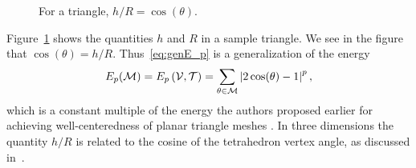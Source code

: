 \documentclass[final]{siamltex}
\begin{document}
\begin{figure}
  \centering
  \caption{For a triangle, $h/R = \cos(\theta).$}
  \label{fig:genE_p}
\end{figure}
 
Figure~\ref{fig:genE_p} shows the quantities $h$ and $R$ in a sample
triangle.
We see in the figure that $\cos(\theta) = h/R$.
Thus~\eqref{eq:genE_p} is a generalization of the energy
\begin{equation}
  \label{eq:Ep}
  E_p(\mathcal{M}) = E_p\left(\mathcal{V}, \mathcal{T}\right) = \sum_{\theta \in \mathcal{M}}
  \left\lvert2\cos(\theta) - 1\right\rvert^p,
\end{equation}
which is a constant multiple of the energy the authors proposed
earlier for achieving well-centeredness of planar triangle meshes
\cite{VaHiGuRa2007}.  In three dimensions the quantity $h/R$ is
related to the cosine of the tetrahedron vertex angle, as discussed
in~\cite{SaHaMoWe2006}.
\end{document}
